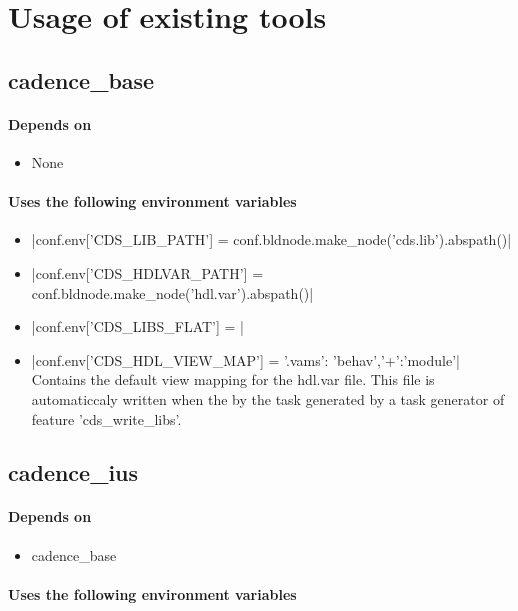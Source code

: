 \chapter{Usage of existing  tools}
\label{chap:bricktools}
\section{cadence\_base}
\subsubsection{Depends on}
\begin{itemize}
    \item None
\end{itemize}
\subsubsection{Uses the following environment variables}
\begin{itemize}
    \item {}|conf.env['CDS_LIB_PATH'] = conf.bldnode.make\_node('cds.lib').abspath()|
    \item {}|conf.env['CDS_HDLVAR_PATH'] = conf.bldnode.make\_node('hdl.var').abspath()|
    \item {}|conf.env['CDS_LIBS_FLAT'] = {}|
    \item {}|conf.env['CDS_HDL_VIEW_MAP'] = {'.vams': 'behav','+':'module'}|
     Contains the default view mapping for the hdl.var file. This file is automaticcaly written when the by the task generated by a task generator of feature 'cds\_write\_libs'.

\end{itemize}

\section{cadence\_ius}
\subsubsection{Depends on}
\begin{itemize}
    \item cadence\_base
\end{itemize}

\subsubsection{Uses the following environment variables}

